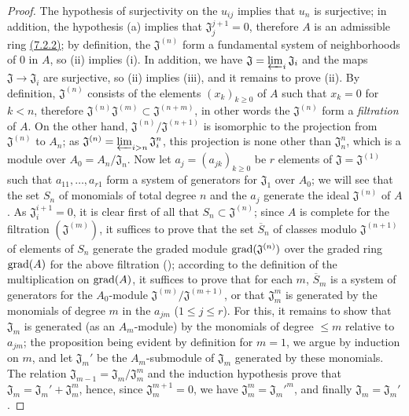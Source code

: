 \begin{proof}
\label{proof-prop-0.7.2.7}
The hypothesis of surjectivity on the $u_{ij}$ implies that $u_n$ is surjective;
in addition, the hypothesis (a) implies that $\mathfrak{J}_j^{j+1}=0$, therefore
$A$ is an admissible ring \hyperref[lem-0.7.2.2]{(7.2.2)}; by definition, the
$\mathfrak{J}^{(n)}$ form a fundamental system of neighborhoods of $0$ in $A$,
so (ii) implies (i). In addition, we have
$\mathfrak{J}=\varprojlim_i\mathfrak{J}_i$ and the maps
$\mathfrak{J}\to\mathfrak{J}_i$ are surjective, so (ii) implies (iii), and it
remains to prove (ii). By definition, $\mathfrak{J}^{(n)}$ consists of the
elements $(x_k)_{k\geqslant 0}$ of $A$ such that $x_k=0$ for $k<n$, therefore
$\mathfrak{J}^{(n)}\mathfrak{J}^{(m)}\subset\mathfrak{J}^{(n+m)}$, in other
words the $\mathfrak{J}^{(n)}$ form a {\em filtration} of $A$. On the other
hand, $\mathfrak{J}^{(n)}/\mathfrak{J}^{(n+1)}$ is isomorphic to the projection
from $\mathfrak{J}^{(n)}$ to $A_n$; as
$\mathfrak{J}^{(n)}=\varprojlim_{i>n}\mathfrak{J}_i^n$, this projection is none
other than $\mathfrak{J}_n^n$, which is a module over $A_0=A_n/\mathfrak{J}_n$.
Now let $a_j=(a_{jk})_{k\geqslant 0}$ be $r$ elements of
$\mathfrak{J}=\mathfrak{J}^{(1)}$ such that $a_{11},\dots,a_{r1}$ form a system
of generators for $\mathfrak{J}_1$ over $A_0$; we will see that the set $S_n$ of
monomials of total degree $n$ and the $a_j$ generate the ideal
$\mathfrak{J}^{(n)}$ of $A$. As $\mathfrak{J}_i^{i+1}=0$, it is clear first of
all that $S_n\subset\mathfrak{J}^{(n)}$; since $A$ is complete for the
filtration $(\mathfrak{J}^{(m)})$, it suffices to prove that the set
$\overline{S}_n$ of classes modulo $\mathfrak{J}^{(n+1)}$ of elements of $S_n$
generate the graded module ${\mathop{\mathrm{grad}}\nolimits}(\mathfrak{J}^{(n)})$ over the graded ring
${\mathop{\mathrm{grad}}\nolimits}(A)$ for the above filtration (\cite[p.~18--06, lemme]{I-1}); according to
the definition of the multiplication on ${\mathop{\mathrm{grad}}\nolimits}(A)$,
it suffices to prove that for each $m$, $\overline{S}_m$ is a system of
generators for the $A_0$-module $\mathfrak{J}^{(m)}/\mathfrak{J}^{(m+1)}$, or
that $\mathfrak{J}_m^m$ is generated by the monomials of degree $m$ in the
$a_{jm}$ ($1\leqslant j\leqslant r$). For this, it remains to show that
$\mathfrak{J}_m$ is generated (as an $A_m$-module) by the monomials of degree
$\leqslant m$ relative to $a_{jm}$; the proposition being evident by definition
for $m=1$, we argue by induction on $m$, and let $\mathfrak{J}_m'$ be the
$A_m$-submodule of $\mathfrak{J}_m$ generated by these monomials. The relation
$\mathfrak{J}_{m-1}=\mathfrak{J}_m/\mathfrak{J}_m^m$ and the induction
hypothesis prove that $\mathfrak{J}_m=\mathfrak{J}_m'+\mathfrak{J}_m^m$, hence,
since $\mathfrak{J}_m^{m+1}=0$, we have $\mathfrak{J}_m^m={\mathfrak{J}_m'}^m$,
and finally $\mathfrak{J}_m=\mathfrak{J}_m'$.
\end{proof}


